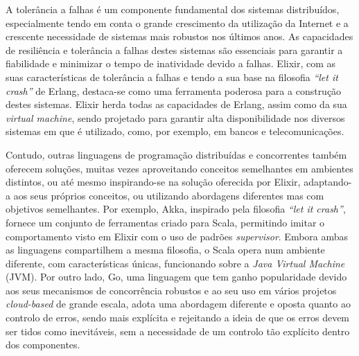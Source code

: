 \begin{abstractotherlanguage}


A tolerância a falhas é um componente fundamental dos sistemas distribuídos, especialmente tendo em conta o grande crescimento da utilização da Internet e a crescente necessidade de sistemas mais robustos nos últimos anos. As capacidades de resiliência e tolerância a falhas destes sistemas são essenciais para garantir a fiabilidade e minimizar o tempo de inatividade devido a falhas. Elixir, com as suas características de tolerância a falhas e tendo a sua base na filosofia \textit{“let it crash”} de Erlang, destaca-se como uma ferramenta poderosa para a construção destes sistemas. Elixir herda todas as capacidades de Erlang, assim como da sua \textit{virtual machine}, sendo projetado para garantir alta disponibilidade nos diversos sistemas em que é utilizado, como, por exemplo, em bancos e telecomunicações.

Contudo, outras linguagens de programação distribuídas e concorrentes também oferecem soluções, muitas vezes aproveitando conceitos semelhantes em ambientes distintos, ou até mesmo inspirando-se na solução oferecida por Elixir, adaptando-a aos seus próprios conceitos, ou utilizando abordagens diferentes mas com objetivos semelhantes. Por exemplo, Akka, inspirado pela filosofia \textit{“let it crash”}, fornece um conjunto de ferramentas criado para Scala, permitindo imitar o comportamento visto em Elixir com o uso de padrões \textit{supervisor}. Embora ambas as linguagens compartilhem a mesma filosofia, o Scala opera num ambiente diferente, com características únicas, funcionando sobre a \textit{Java Virtual Machine} (JVM). Por outro lado, Go, uma linguagem que tem ganho popularidade devido aos seus mecanismos de concorrência robustos e ao seu uso em vários projetos \textit{cloud-based} de grande escala, adota uma abordagem diferente e oposta quanto ao controlo de erros, sendo mais explícita e rejeitando a ideia de que os erros devem ser tidos como inevitáveis, sem a necessidade de um controlo tão explícito dentro dos componentes.


\end{abstractotherlanguage}
